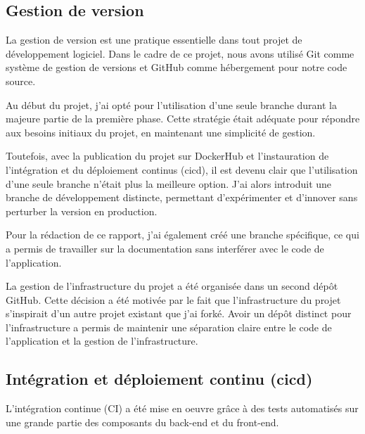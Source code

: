 \subsection{Gestion de version}\label{subsec:gestion-de-version}

La gestion de version est une pratique essentielle dans tout projet de développement logiciel.
Dans le cadre de ce projet, nous avons utilisé Git comme système de gestion de versions et GitHub comme hébergement pour notre code source.

Au début du projet, j'ai opté pour l'utilisation d'une seule branche durant la majeure partie de la première phase.
Cette stratégie était adéquate pour répondre aux besoins initiaux du projet, en maintenant une simplicité de gestion.

Toutefois, avec la publication du projet sur DockerHub et l'instauration de l'intégration et du déploiement continus (\Gls{cicd}), il est devenu clair que l'utilisation d'une seule branche n'était plus la meilleure option.
J'ai alors introduit une branche de développement distincte, permettant d'expérimenter et d'innover sans perturber la version en production.

Pour la rédaction de ce rapport, j'ai également créé une branche spécifique, ce qui a permis de travailler sur la documentation sans interférer avec le code de l'application.

La gestion de l'infrastructure du projet a été organisée dans un second dépôt GitHub.
Cette décision a été motivée par le fait que l'infrastructure du projet s'inspirait d'un autre projet existant que j'ai forké.
Avoir un dépôt distinct pour l'infrastructure a permis de maintenir une séparation claire entre le code de l'application et la gestion de l'infrastructure.

\subsection{Intégration et déploiement continu (\Gls{cicd})}\label{subsec:integration-et-deploiement-continu-(ci/cd)}

L'intégration continue (CI) a été mise en oeuvre grâce à des tests automatisés sur une grande partie des composants du back-end et du front-end.

